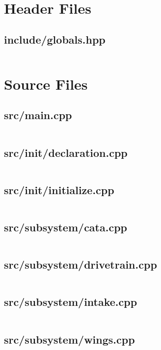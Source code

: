 \section{Header Files}

\subsection{include/globals.hpp}
\inputminted[linenos,tabsize=2,breaklines,frame=lines,framesep=3mm,bgcolor=LightGray]{c}{globals.hpp}
\pagebreak

\section{Source Files}

\subsection{src/main.cpp}
\inputminted[linenos,tabsize=2,breaklines,frame=lines,framesep=3mm,bgcolor=LightGray]{c}{main.cpp}
\pagebreak

\subsection{src/init/declaration.cpp}
\inputminted[linenos,tabsize=2,breaklines,frame=lines,framesep=3mm,bgcolor=LightGray]{c}{declaration.cpp}
\pagebreak

\subsection{src/init/initialize.cpp}
\inputminted[linenos,tabsize=2,breaklines,frame=lines,framesep=3mm,bgcolor=LightGray]{c}{initialize.cpp}
\pagebreak

\subsection{src/subsystem/cata.cpp}
\inputminted[linenos,tabsize=2,breaklines,frame=lines,framesep=3mm,bgcolor=LightGray]{c}{cata.cpp}
\pagebreak

\subsection{src/subsystem/drivetrain.cpp}
\inputminted[linenos,tabsize=2,breaklines,frame=lines,framesep=3mm,bgcolor=LightGray]{c}{drivetrain.cpp}
\pagebreak

\subsection{src/subsystem/intake.cpp}
\inputminted[linenos,tabsize=2,breaklines,frame=lines,framesep=3mm,bgcolor=LightGray]{c}{intake.cpp}
\pagebreak

\subsection{src/subsystem/wings.cpp}
\inputminted[linenos,tabsize=2,breaklines,frame=lines,framesep=3mm,bgcolor=LightGray]{c}{wings.cpp}
\pagebreak

